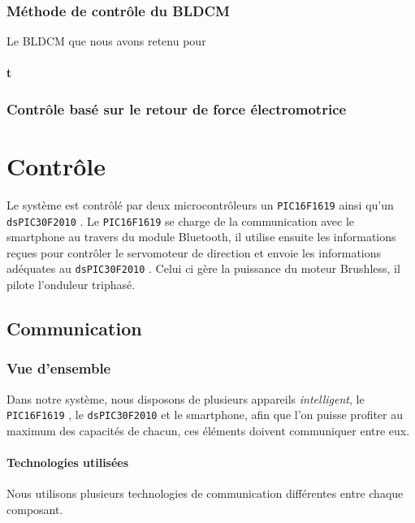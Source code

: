 \documentclass[a4paper,12pt]{book}
\begin{document}
				 \subsection{Méthode de contrôle du BLDCM}
				 
				 Le BLDCM que nous avons retenu pour 
				 
				 	\subsubsection{t}
				 
				 
				 
				 
				 
				 
				 
				 
				 

			
			\subsection{Contrôle basé sur le retour de force électromotrice}
			\newcommand{\pic}{\texttt{PIC16F1619} }
			\newcommand{\dspic}{\texttt{dsPIC30F2010} }
	\chapter{Contrôle}
	Le système est contrôlé par deux microcontrôleurs un \pic ainsi qu'un \dspic. Le \pic se charge de la communication avec le smartphone au travers du module Bluetooth, il utilise ensuite les informations reçues pour contrôler le servomoteur de direction et envoie les informations adéquates au \dspic. Celui ci gère la puissance du moteur Brushless, il pilote l'onduleur triphasé.%
		\section{Communication}
			\subsection{Vue d'ensemble}
				Dans notre système, nous disposons de plusieurs appareils \textit{intelligent}, le \pic , le \dspic et le smartphone, afin que l'on puisse profiter au maximum des capacités de chacun, ces éléments doivent communiquer entre eux.
				\subsubsection{Technologies utilisées}
				Nous utilisons plusieurs technologies de communication différentes entre chaque composant.
\end{document}
